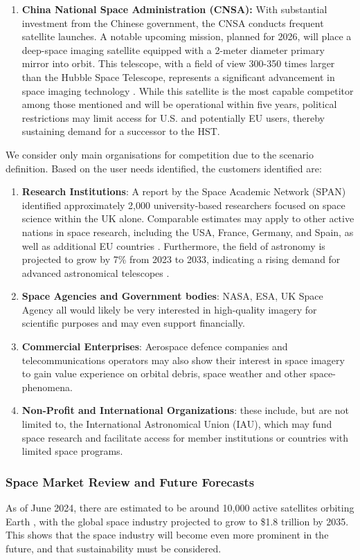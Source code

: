 \begin{enumerate}
    \item \textbf{China National Space Administration (CNSA):} With substantial investment from the Chinese government, the CNSA conducts frequent satellite launches. A notable upcoming mission, planned for 2026, will place a deep-space imaging satellite equipped with a 2-meter diameter primary mirror into orbit. This telescope, with a field of view 300-350 times larger than the Hubble Space Telescope, represents a significant advancement in space imaging technology \cite{CNSA2026}. While this satellite is the most capable competitor among those mentioned and will be operational within five years, political restrictions may limit access for U.S. and potentially EU users, thereby sustaining demand for a successor to the HST.
\end{enumerate}
\noindent We consider only main organisations for competition due to the scenario definition. Based on the user needs identified, the customers identified are:
\begin{enumerate}
    \item \textbf{Research Institutions}: A report by the Space Academic Network (SPAN) identified approximately 2,000 university-based researchers focused on space science within the UK alone. Comparable estimates may apply to other active nations in space research, including the USA, France, Germany, and Spain, as well as additional EU countries \cite{ESPI2022}. Furthermore, the field of astronomy is projected to grow by 7\% from 2023 to 2033, indicating a rising demand for advanced astronomical telescopes \cite{BLS2023}.
    \item \textbf{Space Agencies and Government bodies}: NASA, ESA, UK Space Agency all would likely be very interested in high-quality imagery for scientific purposes and may even support financially. 
    \item \textbf{Commercial Enterprises}: Aerospace defence companies and telecommunications operators may also show their interest in space imagery to gain value experience on orbital debris, space weather and other space-phenomena. 
    \item \textbf{Non-Profit and International Organizations}: these include, but are not limited to, the International Astronomical Union (IAU), which may fund space research and facilitate access for member institutions or countries with limited space programs.
\end{enumerate}



\subsubsection{Space Market Review and Future Forecasts}
As of June 2024, there are estimated to be around 10,000 active satellites orbiting Earth \cite{SpaceWatch2024}, with the global space industry projected to grow to \$1.8 trillion by 2035. This shows that the space industry will become even more prominent in the future, and that sustainability must be considered.\\
\vspace{1.5mm}

